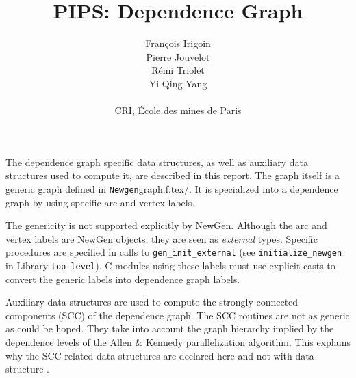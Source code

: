 

\title{PIPS: Dependence Graph}
\author{Fran\c{c}ois Irigoin \\
    Pierre Jouvelot \\
    R\'emi Triolet\\
    Yi-Qing Yang \\
\\
    CRI, \'Ecole des mines de Paris}

\newcommand{\domain}[2]{\paragraph{{#1}}\paragraph{}{#2}}


\maketitle


The dependence graph specific data structures, as well as auxiliary data
structures used to compute it, are described in this report. The graph
itself is a generic graph defined in \verb/Newgen/graph.f.tex/. It is
specialized into a dependence graph by using specific arc and vertex
labels. 

The genericity is not supported explicitly by NewGen\cite{JT89,JT90}. Although the arc
and vertex labels are NewGen objects, they are seen as {\em external}
types. Specific procedures are specified in calls to
\verb/gen_init_external/ (see \verb/initialize_newgen/ in Library
\verb/top-level/). C modules using these labels must use explicit
casts to convert the generic labels into dependence graph labels.

Auxiliary data structures are used to compute the strongly connected
components (SCC) of the dependence graph. The SCC routines are not as
generic as could be hoped. They take into account the graph hierarchy
implied by the dependence levels of the Allen \& Kennedy parallelization
algorithm. This explains why the SCC related data structures are declared
here and not with data structure
.

\begin{comment}
Les structures de donne'es suivantes sont utilise'es par la phase de
construction du graphe des de'pendances. Elles sont construites en
utilisant les structures de donne'es \verb+statement+ et \verb+effect+
qui ont e'te' de'finies dans la repre'sentation interne, ainsi que la
structure de donne'es ge'ne'riques \verb+vertex+ qui fait partie du
package \htmladdnormallink{{\em graph}}{http://www.cri.ensmp.fr/pips/graph}.
\end{comment}

